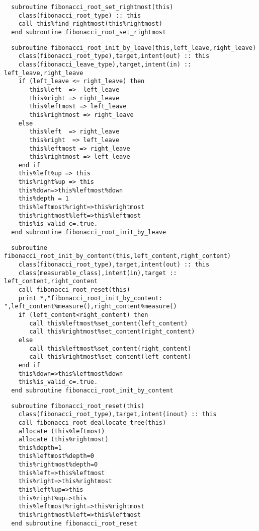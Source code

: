 \begin{Verbatim}
  subroutine fibonacci_root_set_rightmost(this)
    class(fibonacci_root_type) :: this
    call this%find_rightmost(this%rightmost)
  end subroutine fibonacci_root_set_rightmost
\end{Verbatim}

\begin{Verbatim}
  subroutine fibonacci_root_init_by_leave(this,left_leave,right_leave)
    class(fibonacci_root_type),target,intent(out) :: this
    class(fibonacci_leave_type),target,intent(in) :: left_leave,right_leave
    if (left_leave <= right_leave) then
       this%left  =>  left_leave
       this%right => right_leave
       this%leftmost => left_leave
       this%rightmost => right_leave
    else
       this%left  => right_leave
       this%right  => left_leave
       this%leftmost => right_leave
       this%rightmost => left_leave
    end if
    this%left%up => this
    this%right%up => this
    this%down=>this%leftmost%down
    this%depth = 1
    this%leftmost%right=>this%rightmost
    this%rightmost%left=>this%leftmost
    this%is_valid_c=.true.
  end subroutine fibonacci_root_init_by_leave
\end{Verbatim}

\begin{Verbatim}
  subroutine fibonacci_root_init_by_content(this,left_content,right_content)
    class(fibonacci_root_type),target,intent(out) :: this
    class(measurable_class),intent(in),target :: left_content,right_content
    call fibonacci_root_reset(this)
    print *,"fibonacci_root_init_by_content: ",left_content%measure(),right_content%measure()
    if (left_content<right_content) then
       call this%leftmost%set_content(left_content)
       call this%rightmost%set_content(right_content)
    else
       call this%leftmost%set_content(right_content)
       call this%rightmost%set_content(left_content)
    end if
    this%down=>this%leftmost%down
    this%is_valid_c=.true.
  end subroutine fibonacci_root_init_by_content
\end{Verbatim}

\begin{Verbatim}
  subroutine fibonacci_root_reset(this)
    class(fibonacci_root_type),target,intent(inout) :: this
    call fibonacci_root_deallocate_tree(this)
    allocate (this%leftmost)
    allocate (this%rightmost) 
    this%depth=1
    this%leftmost%depth=0
    this%rightmost%depth=0
    this%left=>this%leftmost
    this%right=>this%rightmost
    this%left%up=>this
    this%right%up=>this
    this%leftmost%right=>this%rightmost
    this%rightmost%left=>this%leftmost
  end subroutine fibonacci_root_reset
\end{Verbatim}

